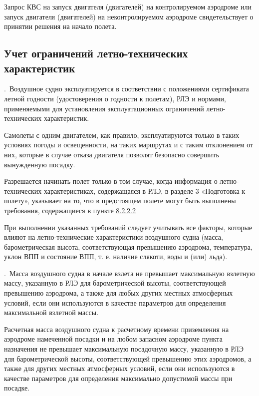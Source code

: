 Запрос КВС на запуск двигателя (двигателей) на контролируемом аэродроме или запуск двигателя (двигателей) на неконтролируемом аэродроме свидетельствует о принятии решения на начало полета.


\subsection{Учет ограничений летно-технических характеристик}
\setcounter{subsect}{1}

\thesubsection.\ Воздушное судно эксплуатируется в соответствии с положениями сертификата летной годности (удостоверения о годности к полетам), РЛЭ и нормами, применяемыми для установления эксплуатационных ограничений летно-технических характеристик.	

Самолеты с одним двигателем, как правило, эксплуатируются только в таких условиях погоды и освещенности, на таких маршрутах и с таким отклонением от них, которые в случае отказа двигателя позволят безопасно совершить вынужденную посадку. 

Разрешается начинать полет только в том случае, когда информация о летно-технических характеристиках, содержащаяся в РЛЭ, в разделе 3 «Подготовка к полету», указывает на то, что в предстоящем полете могут быть выполнены требования, содержащиеся в пункте \hyperref[sec:8222]{8.2.2.2}

При выполнении указанных требований следует учитывать все факторы, которые влияют на летно-технические характеристики воздушного судна (масса, барометрическая высота, соответствующая превышению аэродрома, температура, уклон ВПП и состояние ВПП, т. е. наличие слякоти, воды и (или) льда). 

\thesubsection.\ \label{sec:8222}Масса воздушного судна в начале взлета не превышает максимальную взлетную массу, указанную в РЛЭ для барометрической высоты, соответствующей превышению аэродрома, а также для любых других местных атмосферных условий, если они используются в качестве параметров для определения максимальной взлетной массы. 

Расчетная масса воздушного судна к расчетному времени приземления на аэродроме намеченной посадки и на любом запасном аэродроме пункта назначения не превышает максимальную посадочную массу, указанную в РЛЭ для барометрической высоты, соответствующей превышению этих аэродромов, а также для других местных атмосферных условий, если они используются в качестве параметров для определения максимально допустимой массы при посадке. 

